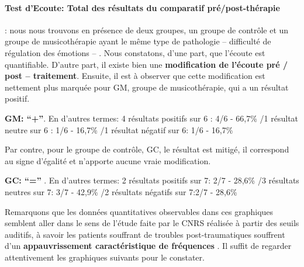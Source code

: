   \clearpage

\paragraph{Test d'Ecoute: Total des résultats du comparatif pré/post-thérapie}
 : nous nous trouvons
           en présence de deux groupes, un groupe de contrôle et un
           groupe de musicothérapie ayant le même type de
           pathologie -- difficulté de régulation des émotions -- .
Nous constatons, d'une part, que l'écoute est quantifiable.
           D'autre part, il existe bien
          une \textbf{modification de l'écoute pré / post -- traitement}.
Ensuite, il est à observer que
          cette modification est nettement plus marquée
          pour GM, groupe de musicothérapie, qui a un résultat positif.
          


          \textbf{GM: ``+''}.
          En d'autres termes: 4 résultats positifs sur 6 : 4/6 - 66,7\%
/1 résultat neutre sur 6 : 1/6 - 16,7\%
/1 résultat négatif sur 6: 1/6 - 16,7\%

Par contre,  pour le groupe de contrôle, GC, le résultat est mitigé, il correspond au signe d'égalité et n'apporte aucune vraie modification.

          \textbf{GC:  ``='' }.
En d'autres termes:  2 résultats positifs sur 7: 2/7 - 28,6\%
/3 résultats neutres sur 7: 3/7 - 42,9\%
/2 résultats négatifs sur 7:2/7 - 28,6\%







Remarquons que les données quantitatives observables dans
ces graphiques sem\-blent aller dans le
sens de  l'étude faite par le
CNRS  réalisée à partir des seuils auditifs, à savoir
les patients souffrant de troubles post-traumatiques souffrent d'un
\textbf{appauvrissement caractéristique de fréquences} \autocite{affectiveDisorders}.
Il suffit de regarder attentivement les graphiques suivants pour le constater.
 

